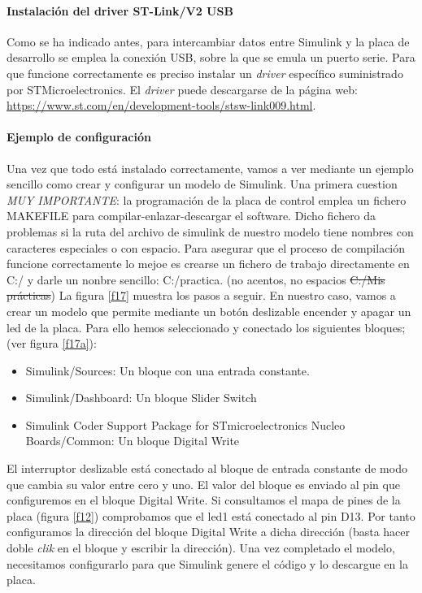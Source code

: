 \documentclass[10pt,a4paper]{report}
\begin{document}
\paragraph{Instalación del driver ST-Link/V2 USB}
Como se ha indicado antes, para intercambiar datos entre Simulink  y la placa de desarrollo se emplea la conexión USB, sobre la que se emula un puerto serie. Para que funcione correctamente es preciso instalar un \emph{driver} específico suministrado por STMicroelectronics. El \emph{driver} puede descargarse de la página web: \url{https://www.st.com/en/development-tools/stsw-link009.html}.
\paragraph{Ejemplo de configuración}
Una vez que todo está instalado correctamente, vamos a ver mediante un ejemplo sencillo como crear y configurar un modelo de Simulink. 
Una primera cuestion \emph{MUY IMPORTANTE}: la programación de la placa de control emplea un fichero MAKEFILE para compilar-enlazar-descargar el software. Dicho fichero da problemas si la ruta del archivo de simulink de nuestro modelo tiene nombres con caracteres especiales o con espacio. Para asegurar que el proceso de compilación funcione correctamente lo mejoe es crearse un fichero de trabajo directamente en C:/ y darle un nonbre sencillo: C:/practica. (no acentos, no espacios \sout{C:/Mis prácticas})
La figura \ref{f17} muestra los pasos a seguir. En nuestro caso, vamos a crear un modelo que permite mediante un botón deslizable encender y apagar un led de la placa. Para ello hemos seleccionado y conectado los siguientes bloques; (ver figura \ref{f17a}):
\begin{itemize}
\item Simulink/Sources: Un bloque con una entrada constante.
\item Simulink/Dashboard: Un bloque Slider Switch
\item Simulink Coder Support Package for STmicroelectronics Nucleo Boards/Common: Un bloque Digital Write  
\end{itemize}
El interruptor deslizable está conectado al bloque de entrada constante de modo que cambia su valor entre cero y uno. El valor del bloque es enviado al pin que configuremos en el bloque Digital Write. Si consultamos el mapa de pines de la placa (figura \ref{f12}) comprobamos que el led1 está conectado al pin D13. Por tanto configuramos la dirección del bloque Digital Write a dicha dirección (basta hacer doble \emph{clik} en el bloque y escribir la dirección). Una vez completado el modelo, necesitamos configurarlo para que Simulink genere el código y lo descargue en la placa.
\end{document}
